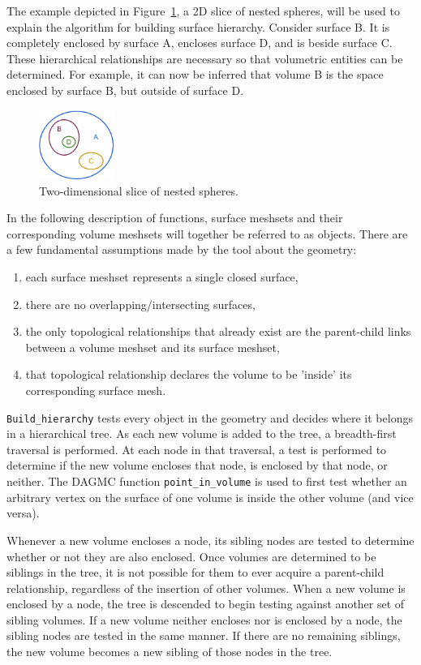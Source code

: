 \documentclass{anstrans}
\begin{document}
The example depicted in Figure~\ref{fig:spheres}, a 2D slice of nested spheres, will 
be used to explain the algorithm for building surface hierarchy. Consider surface B.
It is completely enclosed by surface A, encloses surface D, and is beside surface C. 
These hierarchical relationships are necessary so that volumetric entities can be
determined.  For example, it can now be inferred that volume B is the space enclosed 
by surface B, but outside of surface D.

\begin{figure}[ht]
 \centering
 \includegraphics[width=0.22\textwidth]{../figs/nested_spheres.png}
 \caption{Two-dimensional slice of nested spheres.}
 \label{fig:spheres}
\end{figure}

In the following description of functions, surface meshsets and their corresponding volume meshsets will
together be referred to as objects.  
There are a few fundamental assumptions made by the tool about the geometry:
\begin{enumerate}
\item each surface meshset represents a single closed surface,
\item there are no overlapping/intersecting surfaces, 
\item the only topological relationships that already exist are the parent-child links between a volume meshset and its surface meshset, 
\item that topological relationship declares the volume to be 'inside' its corresponding surface mesh.
\end{enumerate}

\texttt{Build\_hierarchy} tests every object in the geometry and decides where
it belongs in a hierarchical tree.  As each new volume is added to the tree, a
breadth-first traversal is performed.  At each node in that traversal, a test
is performed to determine if the new volume encloses that node, is enclosed by
that node, or neither.  The DAGMC function \texttt{point\_in\_volume} is used
to first test whether an arbitrary vertex on the surface of one volume is
inside the other volume (and vice versa).

Whenever a new volume encloses a node, its sibling nodes are tested to
determine whether or not they are also enclosed.  Once volumes are
determined to be siblings in the tree, it is not possible for them to ever
acquire a parent-child relationship, regardless of the insertion of other
volumes.  When a new volume is enclosed by a node, the tree is descended to
begin testing against another set of sibling volumes.  If a new volume neither
encloses nor is enclosed by a node, the sibling nodes are tested in the same
manner.  If there are no remaining siblings, the new volume becomes a new
sibling of those nodes in the tree.
\end{document}
